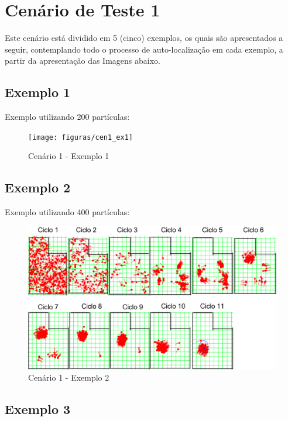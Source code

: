 \section{Cenário de Teste 1}

Este cenário está dividido em 5 (cinco) exemplos, os quais são apresentados a seguir, contemplando todo o processo de auto-localização
em cada exemplo, a partir da apresentação das Imagens abaixo.

\subsection{Exemplo 1}

Exemplo utilizando 200 partículas:

\begin{figure}[H]
  \centering
  \texttt{[image: figuras/cen1\_ex1]}
  \caption[Cenário 1 - Exemplo 1]{Cenário 1 - Exemplo 1}
  \label{img:cen1_ex1}
\end{figure}

\subsection{Exemplo 2}

Exemplo utilizando 400 partículas:

\begin{figure}[H]
  \centering
  \includegraphics[scale=0.4]{figuras/cen1_ex2}
  \caption[Cenário 1 - Exemplo 2]{Cenário 1 - Exemplo 2}
  \label{img:cen1_ex2}
\end{figure}

\subsection{Exemplo 3}

